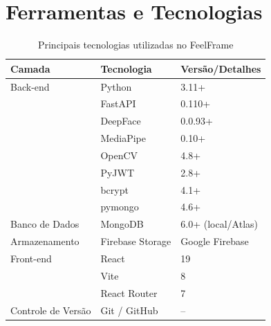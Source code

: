 \documentclass[
	12pt,
	openright,
	oneside,
	a4paper,
	english,
	brazil
	]{abntex2}
\begin{document}
\section{Ferramentas e Tecnologias}

\begin{table}[H]
\centering
\caption{Principais tecnologias utilizadas no FeelFrame}
\label{tab:tecnologias}
\begin{tabular}{|l|l|l|}
\hline
\textbf{Camada}       & \textbf{Tecnologia}          & \textbf{Versão/Detalhes}           \\ \hline
Back-end              & Python                       & 3.11+                              \\ \hline
                      & FastAPI                      & 0.110+                             \\ \hline
                      & DeepFace                     & 0.0.93+                            \\ \hline
                      & MediaPipe                    & 0.10+                              \\ \hline
                      & OpenCV                       & 4.8+                               \\ \hline
                      & PyJWT                        & 2.8+                               \\ \hline
                      & bcrypt                       & 4.1+                               \\ \hline
                      & pymongo                      & 4.6+                               \\ \hline
Banco de Dados        & MongoDB                      & 6.0+ (local/Atlas)                 \\ \hline
Armazenamento         & Firebase Storage             & Google Firebase                    \\ \hline
Front-end             & React                        & 19                                 \\ \hline
                      & Vite                         & 8                                  \\ \hline
                      & React Router                 & 7                                  \\ \hline
Controle de Versão    & Git / GitHub                 & --                                 \\ \hline
\end{tabular}
\end{table}
\end{document}
